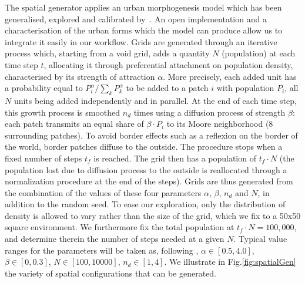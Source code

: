 \documentclass[preprint,5p,times,twocolumn,authoryear]{elsarticle}
\begin{document}
The spatial generator applies an urban morphogenesis model \citep{Batty2007} which has been generalised, explored and calibrated by~\citet{raimbault2018calibration}. An open implementation and a characterisation of the urban forms which the model can produce allow us to integrate it easily in our workflow. Grids are generated through an iterative process which, starting from a void grid, adds a quantity $N$ (population) at each time step $t$, allocating it through preferential attachment on population density, characterised by its strength of attraction $\alpha$. More precisely, each added unit has a probability equal to $P_i^{\alpha}/\sum_k P_k^{\alpha}$ to be added to a patch $i$ with population $P_i$, all $N$ units being added independently and in parallel. At the end of each time step, this growth process is smoothed $n_d$ times using a diffusion process of strength $\beta$: each patch transmits an equal share of $\beta\cdot P_i$ to its Moore neighborhood (8 surrounding patches). To avoid border effects such as a reflexion on the border of the world, border patches diffuse to the outside. The procedure stops when a fixed number of steps $t_f$ is reached. The grid then has a population of $t_f \cdot N$ (the population lost due to diffusion process to the outside is reallocated through a normalization procedure at the end of the steps). Grids are thus generated from the combination of the values of these four  parameters $\alpha$, $\beta$, $n_d$ and $N$, in addition to the random seed. To ease our exploration, only the distribution of density is allowed to vary rather than the size of the grid, which we fix to a 50x50 square environment. We furthermore fix the total population at $t_f\cdot N = 100,000$, and determine therein the number of steps needed at a given $N$. Typical value ranges for the  parameters will be taken as, following \citet{raimbault2018calibration}, $\alpha\in\left[0.5,4.0\right]$, $\beta \in\left[0,0.3\right] $, $N\in \left[100,10000\right]$, $n_d\in\left[1,4\right]$. We illustrate in Fig.\ref{fig:spatialGen} the variety of spatial configurations that can be generated.
\end{document}
